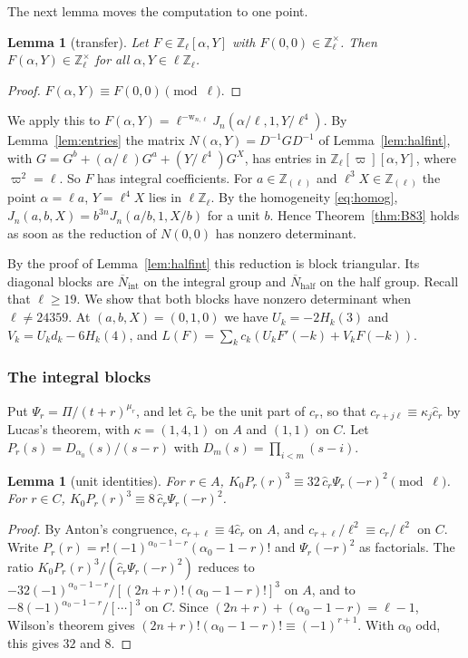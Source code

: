 \documentclass[11pt]{amsart}
\newtheorem{lemma}[theorem]{Lemma}
\theoremstyle{definition}
\theoremstyle{remark}
\numberwithin{equation}{section}
\newcommand{\Z}{\mathbb Z}
\begin{document}
The next lemma moves the computation to one point. 
\begin{lemma}[transfer]\label{lem:PD}
Let $F\in\Z_\ell[\alpha,Y]$ with $F(0,0)\in\Z_\ell^\times$. Then $F(\alpha,Y)\in\Z_\ell^\times$ for all $\alpha,Y\in\ell\Z_\ell$.
\end{lemma}

\begin{proof}
$F(\alpha,Y)\equiv F(0,0)\pmod\ell$.
\end{proof}

We apply this to $F(\alpha,Y)=\ell^{-\mathrm{w}_{n,\ell}}J_n(\alpha/\ell,1,Y/\ell^4)$. By Lemma~\ref{lem:entries} the matrix
$N(\alpha,Y)=D^{-1}GD^{-1}$ of Lemma~\ref{lem:halfint}, with $G=G^b+(\alpha/\ell)G^a+(Y/\ell^4)G^X$, has entries in $\Z_\ell[\varpi][\alpha,Y]$, where $\varpi^2=\ell$. So
$F$ has integral coefficients. For $a\in\Z_{(\ell)}$ and $\ell^3X\in\Z_{(\ell)}$ the point $\alpha=\ell a$, $Y=\ell^4X$
lies in $\ell\Z_\ell$. By the homogeneity \eqref{eq:homog}, $J_n(a,b,X)=b^{3n}J_n(a/b,1,X/b)$ for a unit $b$. Hence
Theorem~\ref{thm:B83} holds as soon as the reduction of $N(0,0)$ has nonzero determinant.

By the proof of Lemma~\ref{lem:halfint} this reduction is block triangular. Its diagonal blocks are
$\overline N_{\mathrm{int}}$ on the integral group and $\overline N_{\mathrm{half}}$ on the half group. Recall that
$\ell\ge19$. We show that both blocks have nonzero determinant when $\ell\ne24359$.
At $(a,b,X)=(0,1,0)$ we have $U_k=-2H_k(3)$ and $V_k=U_kd_k-6H_k(4)$, and $L(F)=\sum_kc_k(U_kF'(-k)+V_kF(-k))$.

\subsubsection{The integral blocks}
Put $\Psi_r=\Pi/(t+r)^{\mu_r}$, and let $\hat c_r$ be the unit part of $c_r$,
so that $c_{r+j\ell}\equiv\kappa_j\hat c_r$ by Lucas's theorem, with $\kappa=(1,4,1)$ on $A$ and $(1,1)$ on $C$. Let
$P_r(s)=D_{\alpha_0}(s)/(s-r)$ with $D_m(s)=\prod_{i<m}(s-i)$.

\begin{lemma}[unit identities]\label{lem:U83}
For $r\in A$, $K_0P_r(r)^3\equiv32\,\hat c_r\Psi_r(-r)^2\pmod\ell$. For $r\in C$, $K_0P_r(r)^3\equiv8\,\hat c_r\Psi_r(-r)^2$.
\end{lemma}

\begin{proof}
By Anton's congruence, $c_{r+\ell}\equiv4\hat c_r$ on $A$, and $c_{r+\ell}/\ell^2\equiv c_r/\ell^2$ on $C$. Write
$P_r(r)=r!(-1)^{\alpha_0-1-r}(\alpha_0-1-r)!$ and $\Psi_r(-r)^2$ as factorials. The ratio
$K_0P_r(r)^3/(\hat c_r\Psi_r(-r)^2)$ reduces to $-32(-1)^{\alpha_0-1-r}/[(2n+r)!(\alpha_0-1-r)!]^3$ on $A$, and to
$-8(-1)^{\alpha_0-1-r}/[\cdots]^3$ on $C$. Since $(2n+r)+(\alpha_0-1-r)=\ell-1$, Wilson's theorem gives
$(2n+r)!(\alpha_0-1-r)!\equiv(-1)^{r+1}$. With $\alpha_0$ odd, this gives $32$ and $8$.
\end{proof}
\end{document}
